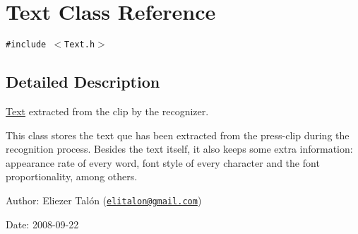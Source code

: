 \hypertarget{class_text}{
\section{Text Class Reference}
\label{class_text}
}
{\tt \#include $<$Text.h$>$}



\subsection{Detailed Description}
\hyperlink{class_text}{Text} extracted from the clip by the recognizer. 

This class stores the text que has been extracted from the press-clip during the recognition process. Besides the text itself, it also keeps some extra information: appearance rate of every word, font style of every character and the font proportionality, among others.

\begin{Desc}
\item[Author:]Eliezer Talón (\href{mailto:elitalon@gmail.com}{\tt elitalon@gmail.com}) \end{Desc}
\begin{Desc}
\item[Date:]2008-09-22 \end{Desc}


